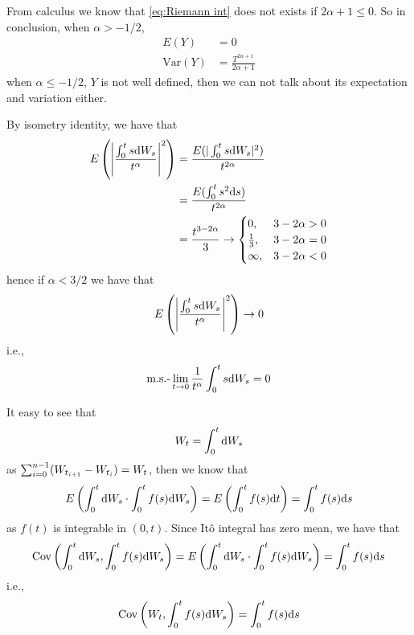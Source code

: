 \documentclass{homework}
\newcommand{\var}{\mathrm{Var}}
\newcommand{\cov}{\mathrm{Cov}}
\begin{document}
\begin{subproblem}[(\arabic*).]
        From calculus we know that \cref{eq:Riemann int} does
        not exists if $2\alpha+1\leq 0$.
        So in conclusion,
        when $\alpha>-1/2$,
        \[\begin{aligned}
            E(Y)&=0\\
            \var(Y)&=\frac{T^{2\alpha+1}}{2\alpha+1}
        \end{aligned}\]
        when $\alpha\leq -1/2$, $Y$ is not well defined, then
        we can not talk about its expectation and variation either.
    \end{subproblem}

    \problem
    By isometry identity, we have that
    \[\begin{aligned}
        E\left(
            \left|\frac{\int_0^ts\mathrm d W_s}{t^\alpha}\right|^2
        \right)&=\frac{E(|\int_0^ts\mathrm d W_s|^2)}{t^{2\alpha}}\\
        &=\frac{E(\int_0^ts^2\mathrm d s)}{t^{2\alpha}}\\
        &=\frac{t^{3-2\alpha}}{3}\to
        \begin{cases}
            0,&3-2\alpha>0\\
            \frac{1}{3},&3-2\alpha=0\\
            \infty,&3-2\alpha<0
        \end{cases}
    \end{aligned}\]
    hence if $\alpha<3/2$ we have that
    \[E\left(
            \left|\frac{\int_0^ts\mathrm d W_s}{t^\alpha}\right|^2
        \right)\to 0\]
    i.e.,
    \[\text{m.s.-}\lim_{t\to0}\frac{1}{t^\alpha}\int_0^ts\mathrm d W_s=0\]

    \problem
    It easy to see that
    \[W_t=\int_0^t\mathrm d W_s\]
    as $\sum_{i=0}^{n-1}(W_{t_{i+1}}-W_{t_i})=W_t$,
    then we know that
    \[E\left(\int_0^t\mathrm d W_s\cdot\int_0^tf(s)\mathrm d W_s\right)
    =E\left(\int_0^tf(s)\mathrm d t\right)=\int_0^tf(s)\mathrm d s\]
    as $f(t)$ is integrable in $(0,t)$.
    Since It\^o integral has zero mean, we have that
    \[\begin{aligned}
        \cov\left(\int_0^t\diff W_s,\int_0^tf(s)\diff W_s\right)
        =E\left(\int_0^t\diff W_s\cdot\int_0^tf(s)\diff W_s\right)
        =\int_0^tf(s)\diff s
    \end{aligned}\]
    i.e.,
    \[\cov\left(W_t,\int_0^tf(s)\diff W_s\right)=
    \int_0^tf(s)\diff s\]

    \problem
    \label{dZt}
\end{document}
